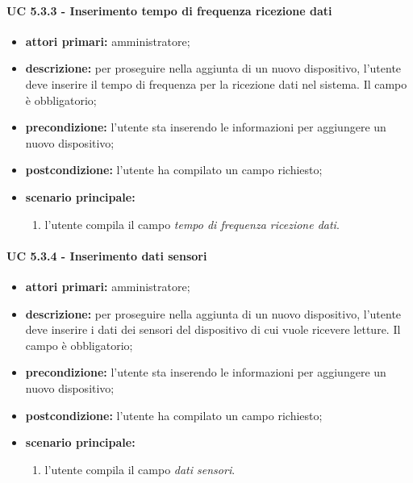 				\paragraph{UC 5.3.3 - Inserimento tempo di frequenza ricezione dati}
				\begin{itemize}
					\item \textbf{attori primari:} amministratore;
					\item \textbf{descrizione:} per proseguire nella aggiunta di un nuovo dispositivo, l'utente deve inserire il tempo di frequenza per la ricezione dati nel sistema. Il campo è obbligatorio;
					\item \textbf{precondizione:} l'utente sta inserendo le informazioni per aggiungere un nuovo dispositivo;
					\item \textbf{postcondizione:} l'utente ha compilato un campo richiesto;
					\item \textbf{scenario principale:}
					\begin{enumerate}
						\item{l'utente compila il campo \textit{tempo di frequenza ricezione dati}.}
					\end{enumerate}
				\end{itemize}

				\paragraph{UC 5.3.4 - Inserimento dati sensori}
				\begin{itemize}
					\item \textbf{attori primari:} amministratore;
					\item \textbf{descrizione:} per proseguire nella aggiunta di un nuovo dispositivo, l'utente deve inserire i dati dei sensori del dispositivo di cui vuole ricevere letture. Il campo è obbligatorio;
					\item \textbf{precondizione:} l'utente sta inserendo le informazioni per aggiungere un nuovo dispositivo;
					\item \textbf{postcondizione:} l'utente ha compilato un campo richiesto;
					\item \textbf{scenario principale:}
					\begin{enumerate}
						\item{l'utente compila il campo \textit{dati sensori}.}
					\end{enumerate}
				\end{itemize}

